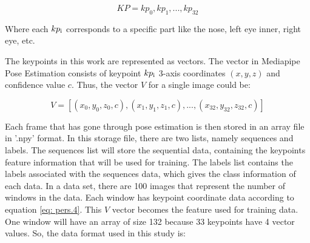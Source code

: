 \begin{equation}\label{eq: pers.3}
	KP = {kp_0, kp_1,..., kp_{32}}
\end{equation}

Where each \(kp\textsubscript{i}\) corresponds to a specific part like the nose, left eye inner, right eye, etc.

The keypoints in this work are represented as vectors. The vector in Mediapipe Pose Estimation consists of keypoint \(kp\textsubscript{i}\) 3-axis coordinates \((x, y, z)\) and confidence value \(c\). Thus, the vector \(V\) for a single image could be:

\begin{equation}\label{eq: pers.4}
	V = \left[\left(x_0, y_0, z_0, c\right), \left(x_1, y_1, z_1, c\right),...,\left(x_{32}, y_{32}, z_{32}, c\right)\right]
\end{equation}

Each frame that has gone through pose estimation is then stored in an array file in '.npy' format. In this storage file, there are two lists, namely sequences and labels. The sequences list will store the sequential data, containing the keypoints feature information that will be used for training. The labels list contains the labels associated with the sequences data, which gives the class information of each data. In a data set, there are 100 images that represent the number of windows in the data. Each window has keypoint coordinate data according to equation \ref{eq: pers.4}. This \(V\) vector becomes the feature used for training data. One window will have an array of size 132 because 33 keypoints have 4 vector values. So, the data format used in this study is:

